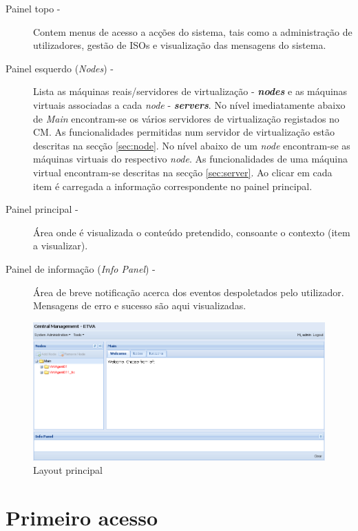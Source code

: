 \begin{description}
	\item[Painel topo -] Contem menus de acesso a acções do sistema, tais como a administração de utilizadores, gestão de ISOs e visualização das mensagens do sistema.
	\item[Painel esquerdo (\emph{Nodes}) -] Lista as máquinas reais/servidores de virtualização - {\bf\emph{nodes}} e as máquinas virtuais associadas a cada \emph{node} - {\bf\emph{servers}}. No nível imediatamente abaixo de \emph{Main} encontram-se os vários servidores de virtualização registados no CM. As funcionalidades permitidas num servidor de virtualização estão descritas na secção \ref{sec:node}. No nível abaixo de um \emph{node} encontram-se as máquinas virtuais do respectivo \emph{node}. As funcionalidades de uma máquina virtual encontram-se descritas na secção \ref{sec:server}. Ao clicar em cada item é carregada a informação correspondente no painel principal.
	\item[Painel principal -] Área onde é visualizada o conteúdo pretendido, consoante o contexto (item a visualizar).
	\item[Painel de informação (\emph{Info Panel}) -] Área de breve notificação acerca dos eventos despoletados pelo utilizador. Mensagens de erro e sucesso são aqui visualizadas.
\end{description}

\begin{figure}[H]
	\begin{center}
	\includegraphics[scale=0.5]{screenshots/principal.png}
	\caption{Layout principal}
	\label{fig:principal}
	\end{center}
\end{figure}

\pagebreak


\section{Primeiro acesso}

